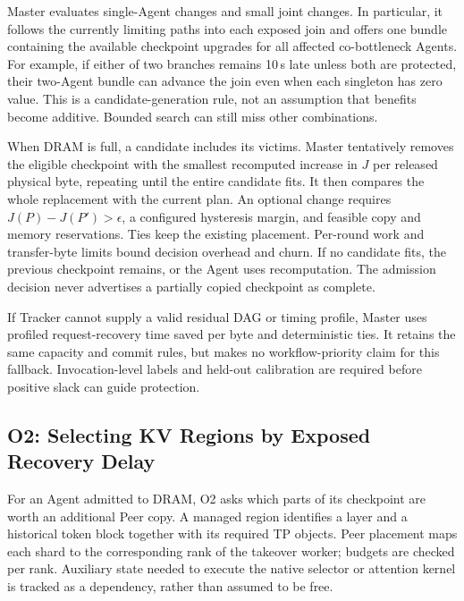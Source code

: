 Master evaluates single-Agent changes and small joint changes. In
particular, it follows the currently limiting paths into each exposed
join and offers one bundle containing the available checkpoint upgrades
for all affected co-bottleneck Agents. For example, if either of two
branches remains 10\,s late unless both are protected, their two-Agent
bundle can advance the join even when each singleton has zero value.
This is a candidate-generation rule, not an assumption that benefits
become additive. Bounded search can still miss other combinations.

When DRAM is full, a candidate includes its victims. Master tentatively
removes the eligible checkpoint with the smallest recomputed increase
in $J$ per released physical byte, repeating until the entire candidate
fits. It then compares the whole replacement with the current plan.
An optional change requires $J(P)-J(P')>\epsilon$, a configured
hysteresis margin, and feasible copy and memory reservations. Ties keep
the existing placement. Per-round work and transfer-byte limits bound
decision overhead and churn. If no candidate fits, the previous
checkpoint remains, or the Agent uses recomputation. The admission
decision never advertises a partially copied checkpoint as complete.

If Tracker cannot supply a valid residual DAG or timing profile, Master
uses profiled request-recovery time saved per byte and deterministic
ties. It retains the same capacity and commit rules, but makes no
workflow-priority claim for this fallback. Invocation-level labels and
held-out calibration are required before positive slack can guide
protection.

\subsection{O2: Selecting KV Regions by Exposed Recovery Delay}
\label{sec:teacher-region-selection}

For an Agent admitted to DRAM, O2 asks which parts of its checkpoint are
worth an additional Peer copy. A managed region identifies a layer and
a historical token block together with its required TP objects. Peer
placement maps each shard to the corresponding rank of the takeover
worker; budgets are checked per rank. Auxiliary state needed to execute
the native selector or attention kernel is tracked as a dependency,
rather than assumed to be free.

